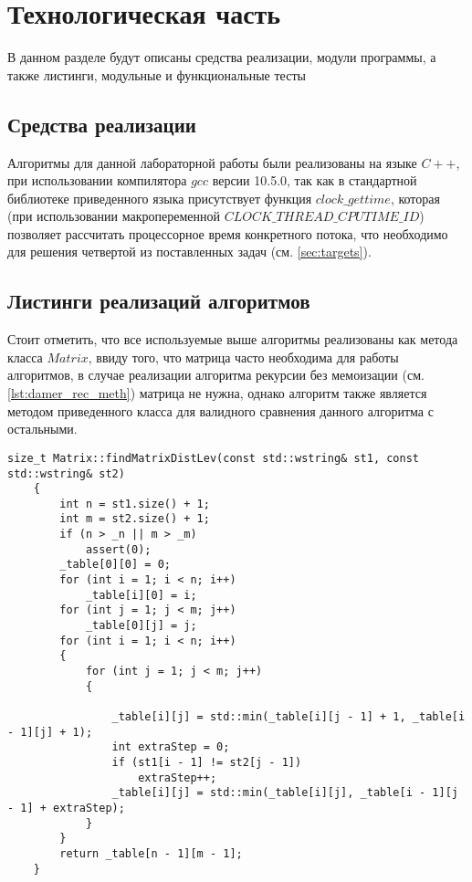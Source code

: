 \chapter{Технологическая часть}
В данном разделе будут описаны средства реализации, модули программы, а также листинги, модульные и функциональные тесты
\section{Средства реализации}
Алгоритмы для данной лабораторной работы были реализованы на языке $C++$, при использовании компилятора $gcc$ версии 10.5.0, так как в стандартной библиотеке приведенного языка
присутствует функция $clock\_gettime$, которая (при использовании макропеременной $CLOCK\_THREAD\_CPUTIME\_ID$) позволяет рассчитать процессорное время конкретного потока, 
что необходимо для решения четвертой из  поставленных задач (см. \ref{sec:targets}).



\section{Листинги реализаций алгоритмов}

Стоит отметить, что все используемые выше алгоритмы реализованы как метода класса $Matrix$, ввиду того, что матрица
часто необходима для работы алгоритмов, в случае реализации алгоритма рекурсии без мемоизации (см. \ref{lst:damer_rec_meth}) матрица не нужна, однако 
алгоритм также является методом приведенного класса для валидного сравнения данного алгоритма с остальными.

\begin{lstlisting}[label=lst:lev_matr,caption=Метод нахождения расстояния Левенштейна с использованием матрицы]
    size_t Matrix::findMatrixDistLev(const std::wstring& st1, const std::wstring& st2)
    {
        int n = st1.size() + 1;
        int m = st2.size() + 1;
        if (n > _n || m > _m)
            assert(0);
        _table[0][0] = 0;
        for (int i = 1; i < n; i++)
            _table[i][0] = i;
        for (int j = 1; j < m; j++)
            _table[0][j] = j;
        for (int i = 1; i < n; i++)
        {
            for (int j = 1; j < m; j++)
            {
    
                _table[i][j] = std::min(_table[i][j - 1] + 1, _table[i - 1][j] + 1);
                int extraStep = 0;
                if (st1[i - 1] != st2[j - 1])
                    extraStep++;
                _table[i][j] = std::min(_table[i][j], _table[i - 1][j - 1] + extraStep);
            }
        }
        return _table[n - 1][m - 1];
    }
\end{lstlisting}

